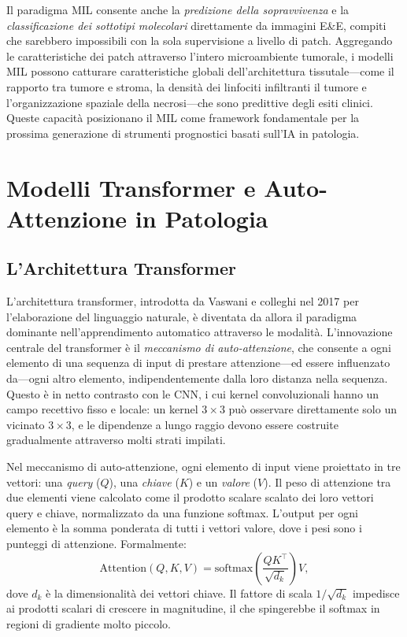Il paradigma MIL consente anche la \emph{predizione della sopravvivenza} e la \emph{classificazione dei sottotipi molecolari} direttamente da immagini E\&E, compiti che sarebbero impossibili con la sola supervisione a livello di patch. Aggregando le caratteristiche dei patch attraverso l'intero microambiente tumorale, i modelli MIL possono catturare caratteristiche globali dell'architettura tissutale---come il rapporto tra tumore e stroma, la densità dei linfociti infiltranti il tumore e l'organizzazione spaziale della necrosi---che sono predittive degli esiti clinici. Queste capacità posizionano il MIL come framework fondamentale per la prossima generazione di strumenti prognostici basati sull'IA in patologia.

\section{Modelli Transformer e Auto-Attenzione in Patologia}
\label{sec:ch4_transformer}

\subsection{L'Architettura Transformer}

L'architettura transformer, introdotta da Vaswani e colleghi nel 2017 per l'elaborazione del linguaggio naturale, è diventata da allora il paradigma dominante nell'apprendimento automatico attraverso le modalità. L'innovazione centrale del transformer è il \emph{meccanismo di auto-attenzione}, che consente a ogni elemento di una sequenza di input di prestare attenzione---ed essere influenzato da---ogni altro elemento, indipendentemente dalla loro distanza nella sequenza. Questo è in netto contrasto con le CNN, i cui kernel convoluzionali hanno un campo recettivo fisso e locale: un kernel $3 \times 3$ può osservare direttamente solo un vicinato $3 \times 3$, e le dipendenze a lungo raggio devono essere costruite gradualmente attraverso molti strati impilati.

Nel meccanismo di auto-attenzione, ogni elemento di input viene proiettato in tre vettori: una \emph{query} ($Q$), una \emph{chiave} ($K$) e un \emph{valore} ($V$). Il peso di attenzione tra due elementi viene calcolato come il prodotto scalare scalato dei loro vettori query e chiave, normalizzato da una funzione softmax. L'output per ogni elemento è la somma ponderata di tutti i vettori valore, dove i pesi sono i punteggi di attenzione. Formalmente:
\[
  \text{Attention}(Q, K, V) = \text{softmax}\!\left(\frac{QK^\top}{\sqrt{d_k}}\right)V,
\]
dove $d_k$ è la dimensionalità dei vettori chiave. Il fattore di scala $1/\sqrt{d_k}$ impedisce ai prodotti scalari di crescere in magnitudine, il che spingerebbe il softmax in regioni di gradiente molto piccolo.

